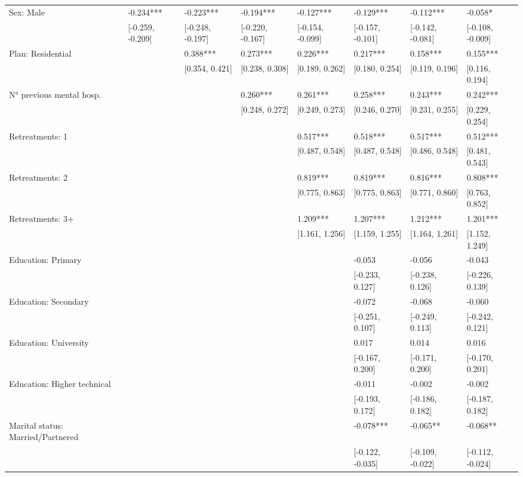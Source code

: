 \documentclass[
  spanish,
  10pt,
]{article}
\begin{document}
\begin{table}[H]
{\begin{tabular}[t]{llllllll}
Sex: Male & -0.234*** & -0.223*** & -0.194*** & -0.127*** & -0.129*** & -0.112*** & -0.058*\\
 & {}[-0.259, -0.209] & {}[-0.248, -0.197] & {}[-0.220, -0.167] & {}[-0.154, -0.099] & {}[-0.157, -0.101] & {}[-0.142, -0.081] & {}[-0.108, -0.009]\\
Plan: Residential &  & 0.388*** & 0.273*** & 0.226*** & 0.217*** & 0.158*** & 0.155***\\
 &  & {}[0.354, 0.421] & {}[0.238, 0.308] & {}[0.189, 0.262] & {}[0.180, 0.254] & {}[0.119, 0.196] & {}[0.116, 0.194]\\
N° previous mental hosp. &  &  & 0.260*** & 0.261*** & 0.258*** & 0.243*** & 0.242***\\
 &  &  & {}[0.248, 0.272] & {}[0.249, 0.273] & {}[0.246, 0.270] & {}[0.231, 0.255] & {}[0.229, 0.254]\\
Retreatments: 1 &  &  &  & 0.517*** & 0.518*** & 0.517*** & 0.512***\\
 &  &  &  & {}[0.487, 0.548] & {}[0.487, 0.548] & {}[0.486, 0.548] & {}[0.481, 0.543]\\
Retreatments: 2 &  &  &  & 0.819*** & 0.819*** & 0.816*** & 0.808***\\
 &  &  &  & {}[0.775, 0.863] & {}[0.775, 0.863] & {}[0.771, 0.860] & {}[0.763, 0.852]\\
Retreatments: 3+ &  &  &  & 1.209*** & 1.207*** & 1.212*** & 1.201***\\
 &  &  &  & {}[1.161, 1.256] & {}[1.159, 1.255] & {}[1.164, 1.261] & {}[1.152, 1.249]\\
Education: Primary &  &  &  &  & -0.053 & -0.056 & -0.043\\
 &  &  &  &  & {}[-0.233, 0.127] & {}[-0.238, 0.126] & {}[-0.226, 0.139]\\
Education: Secondary &  &  &  &  & -0.072 & -0.068 & -0.060\\
 &  &  &  &  & {}[-0.251, 0.107] & {}[-0.249, 0.113] & {}[-0.242, 0.121]\\
Education: University &  &  &  &  & 0.017 & 0.014 & 0.016\\
 &  &  &  &  & {}[-0.167, 0.200] & {}[-0.171, 0.200] & {}[-0.170, 0.201]\\
Education: Higher technical &  &  &  &  & -0.011 & -0.002 & -0.002\\
 &  &  &  &  & {}[-0.193, 0.172] & {}[-0.186, 0.182] & {}[-0.187, 0.182]\\
Marital status: Married/Partnered &  &  &  &  & -0.078*** & -0.065** & -0.068**\\
 &  &  &  &  & {}[-0.122, -0.035] & {}[-0.109, -0.022] & {}[-0.112, -0.024]\\

\end{tabular}}
\end{table}
\end{document}
